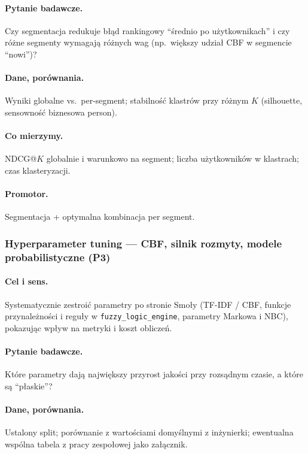 \documentclass[a4paper,11pt]{article}
\newcommand{\code}[1]{\texttt{\small #1}}
\begin{document}
\paragraph{Pytanie badawcze.}
Czy segmentacja redukuje błąd rankingowy ``średnio po użytkownikach'' i czy różne segmenty wymagają różnych wag (np.\ większy udział CBF w segmencie ``nowi'')?

\paragraph{Dane, porównania.}
Wyniki globalne vs.\ per-segment; stabilność klastrów przy różnym $K$ (silhouette, sensowność biznesowa person).

\paragraph{Co mierzymy.}
NDCG@$K$ globalnie i warunkowo na segment; liczba użytkowników w klastrach; czas klasteryzacji.

\paragraph{Promotor.}
Segmentacja + optymalna kombinacja per segment.

\subsubsection{Hyperparameter tuning --- CBF, silnik rozmyty, modele probabilistyczne (\textbf{P3})}

\paragraph{Cel i sens.}
Systematycznie zestroić parametry po stronie Smoły (TF-IDF / CBF, funkcje przynależności i reguły w \code{fuzzy\_logic\_engine}, parametry Markowa i NBC), pokazując wpływ na metryki i koszt obliczeń.

\paragraph{Pytanie badawcze.}
Które parametry dają największy przyrost jakości przy rozsądnym czasie, a które są ``płaskie''?

\paragraph{Dane, porównania.}
Ustalony split; porównanie z wartościami domyślnymi z inżynierki; ewentualna wspólna tabela z pracy zespołowej jako załącznik.
\end{document}
